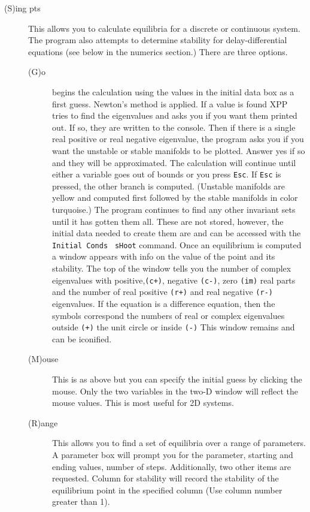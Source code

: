 \documentclass{article}
\newcommand{\tc}[1]{\addcontentsline{toc}{subsection}{#1}}
\begin{document}
\begin{description}
\begin{description}
\end{description}


\tc{Equilibria}\item[(S)ing pts]  This allows you to calculate
equilibria for a discrete or continuous system.  The program also
attempts to determine stability for delay-differential equations (see
below in the numerics section.) There
 are three options.
\begin{description}
	\item[(G)o] begins the calculation   using the values in the initial
data box as a first guess.  Newton's method is applied.  If a value is found XPP
 tries to find the eigenvalues and asks you if you want them printed out.  If so,
 they are written to the console.  Then if there is a single real positive or
 real negative eigenvalue, the program asks you if you want the unstable or
 stable manifolds to be plotted.  Answer yes if so and they will be
 approximated. The calculation will continue until either a variable
goes out
 of bounds or you press {\tt Esc}.  If {\tt Esc} is pressed, the other
branch is
 computed. (Unstable manifolds are yellow and computed first followed
by the stable manifolds in color turquoise.)
 The program continues to find any other invariant sets until it has gotten
them all.  These are not stored, however, the initial data needed to
create them are and can be accessed with the {\tt Initial Conds} {\tt
sHoot} command.
Once an
equilibrium is computed a window
appears with info on the value of the point and its stability.  The top of
the window tells you the number of complex eigenvalues with positive,{\tt (c+)},
negative {\tt (c-)}, zero {\tt (im)}  real parts and the number of
real positive
{\tt  (r+)}  and
real negative { \tt (r-)}  eigenvalues. If the equation is a difference equation,
then the symbols correspond the numbers of real or complex eigenvalues
outside {\tt (+)}  the unit circle or inside { \tt (-)}
This window remains and can be iconified.
\item[(M)ouse]  This is as above but you can specify the initial guess by
clicking the mouse.  Only the two variables in the two-D window will reflect
the mouse values.  This is most useful for 2D systems.
\item[(R)ange]  This allows you to find a set of equilibria over a range
 of parameters.  A parameter box will prompt you for the parameter, starting
 and ending values, number of steps.  Additionally, two other items are
requested.  Column for stability will record the stability of the equilibrium
point in the specified column (Use column number greater than 1).

\end{description}
\end{description}
\end{document}
